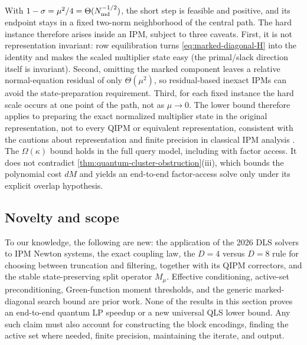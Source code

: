 With $1-\sigma=\mu^2/4=\Theta(N_{\rm md}^{-1/2})$, the short step is feasible
and positive, and its endpoint stays in a fixed two-norm neighborhood of the
central path.  The hard instance therefore arises inside an IPM, subject to
three caveats.
First, it is not representation invariant: row equilibration turns
\eqref{eq:marked-diagonal-H} into the identity and makes the scaled
multiplier state easy (the primal/slack direction itself is invariant).
Second, omitting the marked component leaves a relative normal-equation
residual of only $\Theta(\mu^2)$, so residual-based inexact IPMs can avoid
the state-preparation requirement.  Third, for each fixed instance the hard
scale occurs at one point of the path, not as $\mu\to0$.  The lower bound
therefore applies to preparing the exact normalized multiplier state in the
original representation, not to every QIPM or equivalent representation,
consistent with the cautions about representation and finite precision in
classical IPM analysis
\cite{wright1998-ill-conditioning-computational-error-interior}.
The $\Omega(\kappa)$ bound holds in the full query model, including with
factor access.  It does not contradict
\cref{thm:quantum-cluster-obstruction}\textup{(iii)}, which bounds the
polynomial cost $dM$ and yields an end-to-end factor-access solve only
under its explicit overlap hypothesis.

\subsection{Novelty and scope}

To our knowledge, the following are new: the application of the 2026 DLS
solvers to IPM Newton systems, the exact coupling law, the $D=4$ versus
$D=8$ rule for choosing between truncation and filtering, together with its
QIPM correctors, and the stable state-preserving split operator $M_\mu$.  Effective
conditioning, active-set preconditioning, Green-function moment thresholds,
and the generic marked-diagonal search bound are prior work.  None of the
results in this section proves an end-to-end quantum LP speedup or a new
universal QLS lower bound.  Any such claim must also account for
constructing the block encodings, finding the active set where needed,
finite precision, maintaining the iterate, and output.
